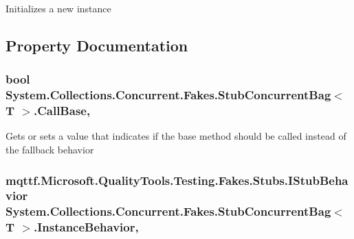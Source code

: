 Initializes a new instance



\subsection{Property Documentation}
\hypertarget{class_system_1_1_collections_1_1_concurrent_1_1_fakes_1_1_stub_concurrent_bag_3_01_t_01_4_ad3e3bef5f788d32f2b9a48b27bfa05e7}{
\subsubsection[{Call\-Base}]{\setlength{\rightskip}{0pt plus 5cm}bool System.\-Collections.\-Concurrent.\-Fakes.\-Stub\-Concurrent\-Bag$<$ T $>$.Call\-Base\hspace{0.3cm}{\ttfamily [get]}, {\ttfamily [set]}}}\label{class_system_1_1_collections_1_1_concurrent_1_1_fakes_1_1_stub_concurrent_bag_3_01_t_01_4_ad3e3bef5f788d32f2b9a48b27bfa05e7}


Gets or sets a value that indicates if the base method should be called instead of the fallback behavior

\hypertarget{class_system_1_1_collections_1_1_concurrent_1_1_fakes_1_1_stub_concurrent_bag_3_01_t_01_4_a2966a35e1cfa0630a6bf0a4cffb4545d}{
\subsubsection[{Instance\-Behavior}]{\setlength{\rightskip}{0pt plus 5cm}mqttf.\-Microsoft.\-Quality\-Tools.\-Testing.\-Fakes.\-Stubs.\-I\-Stub\-Behavior System.\-Collections.\-Concurrent.\-Fakes.\-Stub\-Concurrent\-Bag$<$ T $>$.Instance\-Behavior\hspace{0.3cm}{\ttfamily [get]}, {\ttfamily [set]}}}\label{class_system_1_1_collections_1_1_concurrent_1_1_fakes_1_1_stub_concurrent_bag_3_01_t_01_4_a2966a35e1cfa0630a6bf0a4cffb4545d}


